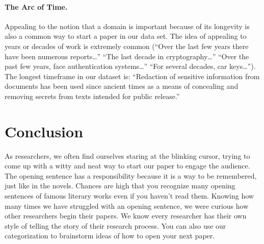 \documentclass[sigconf,anonymous]{acmart}
\begin{document}
\paragraph{The Arc of Time.} Appealing to the notion that a domain is important because of its longevity is also a common way to start a paper in our data set. The idea of appealing to years or decades of work is extremely common (``Over the last few years there have been numerous reports…'' ``The last decade in cryptography…'' ``Over the past few years, face authentication systems…'' ``For several decades, car keys…''). The longest timeframe in our dataset is: ``Redaction of sensitive information from documents has been used since ancient times as a means of concealing and removing secrets from texts intended for public release.''


\section{Conclusion}

As researchers, we often find ourselves staring at the blinking cursor, trying to come up with a witty and neat way to start our paper to engage the audience. The opening sentence has a responsibility because it is a way to be remembered, just like in the novels. Chances are high that you recognize many opening sentences of famous literary works even if you haven’t read them. Knowing how many times we have struggled with an opening sentence, we were curious how other researchers begin their papers. We know every researcher has their own style of telling the story of their research process. You can also use our categorization to brainstorm ideas of how to open your next paper.  		
	
	
	
	
\end{document}
